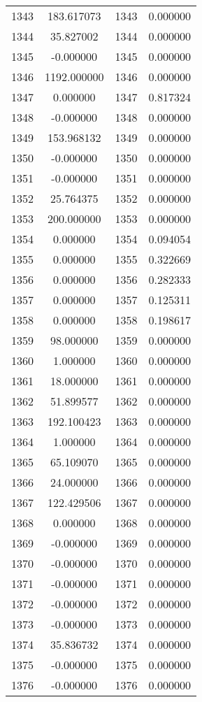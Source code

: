 \documentclass[12pt]{article}
\begin{document}
\begin{longtable}{@{}cccc@{}}
1343 & 183.617073 & 1343 & 0.000000 \\
1344 & 35.827002 & 1344 & 0.000000 \\
1345 & -0.000000 & 1345 & 0.000000 \\
1346 & 1192.000000 & 1346 & 0.000000 \\
1347 & 0.000000 & 1347 & 0.817324 \\
1348 & -0.000000 & 1348 & 0.000000 \\
1349 & 153.968132 & 1349 & 0.000000 \\
1350 & -0.000000 & 1350 & 0.000000 \\
1351 & -0.000000 & 1351 & 0.000000 \\
1352 & 25.764375 & 1352 & 0.000000 \\
1353 & 200.000000 & 1353 & 0.000000 \\
1354 & 0.000000 & 1354 & 0.094054 \\
1355 & 0.000000 & 1355 & 0.322669 \\
1356 & 0.000000 & 1356 & 0.282333 \\
1357 & 0.000000 & 1357 & 0.125311 \\
1358 & 0.000000 & 1358 & 0.198617 \\
1359 & 98.000000 & 1359 & 0.000000 \\
1360 & 1.000000 & 1360 & 0.000000 \\
1361 & 18.000000 & 1361 & 0.000000 \\
1362 & 51.899577 & 1362 & 0.000000 \\
1363 & 192.100423 & 1363 & 0.000000 \\
1364 & 1.000000 & 1364 & 0.000000 \\
1365 & 65.109070 & 1365 & 0.000000 \\
1366 & 24.000000 & 1366 & 0.000000 \\
1367 & 122.429506 & 1367 & 0.000000 \\
1368 & 0.000000 & 1368 & 0.000000 \\
1369 & -0.000000 & 1369 & 0.000000 \\
1370 & -0.000000 & 1370 & 0.000000 \\
1371 & -0.000000 & 1371 & 0.000000 \\
1372 & -0.000000 & 1372 & 0.000000 \\
1373 & -0.000000 & 1373 & 0.000000 \\
1374 & 35.836732 & 1374 & 0.000000 \\
1375 & -0.000000 & 1375 & 0.000000 \\
1376 & -0.000000 & 1376 & 0.000000 \\

\end{longtable}
\end{document}
